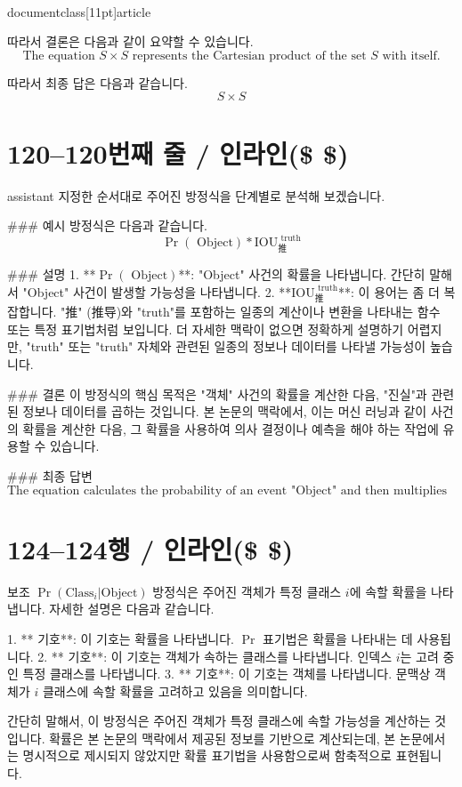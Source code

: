 \\documentclass[11pt]{article}
\begin{document}
따라서 결론은 다음과 같이 요약할 수 있습니다.
\[ \text{The equation } S \times S \text{ represents the Cartesian product of the set } S \text{ with itself.} \]

따라서 최종 답은 다음과 같습니다.
\[ \boxed{S \times S} \]

\section*{120–120번째 줄 / 인라인(\$ \$) }
assistant
지정한 순서대로 주어진 방정식을 단계별로 분석해 보겠습니다.

### 예시
방정식은 다음과 같습니다.
\[
\Pr(\textrm{ Object}) * \textrm{IOU}_{\textrm{推}}^{\textrm{ truth}}
\]

### 설명
1. **\(\Pr(\textrm{ Object})\)**: "Object" 사건의 확률을 나타냅니다. 간단히 말해서 "Object" 사건이 발생할 가능성을 나타냅니다.
2. **\(\textrm{IOU}_{\textrm{推}}^{\textrm{ truth}}\)**: 이 용어는 좀 더 복잡합니다. "推" (推导)와 "truth"를 포함하는 일종의 계산이나 변환을 나타내는 함수 또는 특정 표기법처럼 보입니다. 더 자세한 맥락이 없으면 정확하게 설명하기 어렵지만, "truth" 또는 "truth" 자체와 관련된 일종의 정보나 데이터를 나타낼 가능성이 높습니다.

### 결론
이 방정식의 핵심 목적은 "객체" 사건의 확률을 계산한 다음, "진실"과 관련된 정보나 데이터를 곱하는 것입니다. 본 논문의 맥락에서, 이는 머신 러닝과 같이 사건의 확률을 계산한 다음, 그 확률을 사용하여 의사 결정이나 예측을 해야 하는 작업에 유용할 수 있습니다.

### 최종 답변
\[
\boxed{\text{The equation calculates the probability of an event "Object" and then multiplies it by some information or data related to the "truth".}}
\]

\section*{124–124행 / 인라인(\$ \$)}
보조
\(\Pr(\textrm{Class}_i | \textrm{Object})\) 방정식은 주어진 객체가 특정 클래스 \(i\)에 속할 확률을 나타냅니다. 자세한 설명은 다음과 같습니다.

1. ** 기호**: 이 기호는 확률을 나타냅니다. \(\Pr\) 표기법은 확률을 나타내는 데 사용됩니다.
2. ** 기호**: 이 기호는 객체가 속하는 클래스를 나타냅니다. 인덱스 \(i\)는 고려 중인 특정 클래스를 나타냅니다.
3. ** 기호**: 이 기호는 객체를 나타냅니다. 문맥상 객체가 \(i\) 클래스에 속할 확률을 고려하고 있음을 의미합니다.

간단히 말해서, 이 방정식은 주어진 객체가 특정 클래스에 속할 가능성을 계산하는 것입니다. 확률은 본 논문의 맥락에서 제공된 정보를 기반으로 계산되는데, 본 논문에서는 명시적으로 제시되지 않았지만 확률 표기법을 사용함으로써 함축적으로 표현됩니다.
\end{document}
